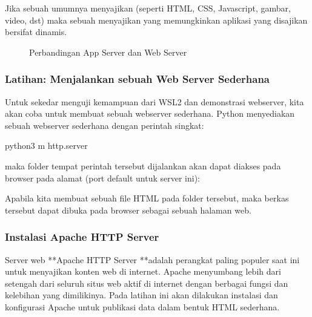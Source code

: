 \documentclass[letterpaper,10pt,english]{sphinxmanual}
\let\sphinxpxdimen\pdfpxdimen\else\newdimen\sphinxpxdimen
\begin{document}
Jika sebuah  umumnya menyajikan (seperti HTML, CSS, Javascript, gambar, video, dst) maka sebuah  menyajikan  yang memungkinkan aplikasi yang disajikan bersifat dinamis.

\begin{figure}[htbp]
\centering
\capstart

\noindent\sphinxincludegraphics[height=500\sphinxpxdimen]{{2020-12-03-03-02-24}.png}
\caption{Perbandingan App Server dan Web Server}\label{\detokenize{sesi1/linuxserver:appserver}}\end{figure}


\subsubsection{Latihan: Menjalankan sebuah Web Server Sederhana}
\label{\detokenize{sesi1/linuxserver:latihan-menjalankan-sebuah-web-server-sederhana}}
Untuk sekedar menguji kemampuan  dari WSL2 dan demonstrasi webserver, kita akan coba untuk membuat sebuah webserver sederhana. Python menyediakan sebuah webserver sederhana dengan perintah singkat:

\begin{sphinxVerbatim}[commandchars=\\\{\}]
python3 \PYGZhy{}m http.server  
\end{sphinxVerbatim}

maka folder tempat perintah tersebut dijalankan akan dapat diakses pada browser pada alamat  (port default untuk server ini):


Apabila kita membuat sebuah file HTML pada folder tersebut, maka berkas tersebut dapat dibuka pada browser sebagai sebuah halaman web.


\subsubsection{Instalasi Apache HTTP Server}
\label{\detokenize{sesi1/linuxserver:instalasi-apache-http-server}}
Server web **Apache HTTP Server **adalah perangkat paling populer saat ini untuk menyajikan konten web di internet. Apache menyumbang lebih dari setengah dari seluruh situs web aktif di internet dengan berbagai fungsi dan kelebihan yang dimilikinya.
Pada latihan ini akan dilakukan instalasi dan konfigurasi Apache untuk publikasi data dalam bentuk HTML sederhana.
\end{document}
